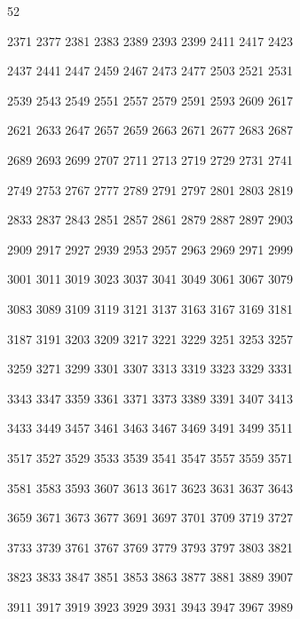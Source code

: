 \documentclass{article}
\begin{document}

52

2371   2377   2381   2383   2389   2393   2399   2411   2417   2423 

   2437   2441   2447   2459   2467   2473   2477   2503   2521   2531 

   2539   2543   2549   2551   2557   2579   2591   2593   2609   2617 

   2621   2633   2647   2657   2659   2663   2671   2677   2683   2687 

   2689   2693   2699   2707   2711   2713   2719   2729   2731   2741 

   2749   2753   2767   2777   2789   2791   2797   2801   2803   2819 

   2833   2837   2843   2851   2857   2861   2879   2887   2897   2903 

   2909   2917   2927   2939   2953   2957   2963   2969   2971   2999 

   3001   3011   3019   3023   3037   3041   3049   3061   3067   3079 

   3083   3089   3109   3119   3121   3137   3163   3167   3169   3181 

   3187   3191   3203   3209   3217   3221   3229   3251   3253   3257 

   3259   3271   3299   3301   3307   3313   3319   3323   3329   3331 

   3343   3347   3359   3361   3371   3373   3389   3391   3407   3413 

   3433   3449   3457   3461   3463   3467   3469   3491   3499   3511 

   3517   3527   3529   3533   3539   3541   3547   3557   3559   3571 

   3581   3583   3593   3607   3613   3617   3623   3631   3637   3643 

   3659   3671   3673   3677   3691   3697   3701   3709   3719   3727 

   3733   3739   3761   3767   3769   3779   3793   3797   3803   3821 

   3823   3833   3847   3851   3853   3863   3877   3881   3889   3907 

   3911   3917   3919   3923   3929   3931   3943   3947   3967   3989
\end{document}
